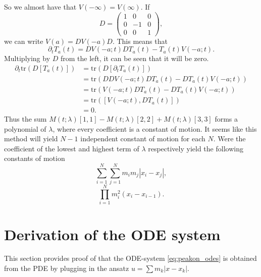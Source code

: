 \documentclass[english,master]{liumaiex}
\theoremstyle{plain}
\theoremstyle{definition}
\newcommand{\tr}{\text{tr}}
\begin{document}
So we almost have that $V(-\infty) = V(\infty)$. If
\begin{equation}
	D = 
\begin{pmatrix}
	1 & 0 & 0 \\
	0 & -1 & 0 \\
	0 & 0 & 1
\end{pmatrix},
\end{equation}
%
we can write $V(a) = DV(-a)D$. This means that 
\begin{equation}
	\partial_t T_a(t) = DV(-a;t)DT_a(t) - T_a(t)V(-a;t).
\end{equation}
Multiplying by $D$ from the left, it can be seen that it will be zero.
\begin{equation}
\begin{aligned}
	\partial_t \tr(D [T_a(t)])
	&= \tr(D [\partial_t T_a(t)]) \\
	&= \tr(DDV(-a;t)DT_a(t) - DT_a(t)V(-a;t)) \\
	&= \tr(V(-a;t)DT_a(t) - DT_a(t)V(-a;t)) \\
	&= \tr([V(-a;t), DT_a(t)]) \\
	&= 0.
\end{aligned}
\end{equation}
Thus the sum $M(t;\lambda)[1,1] - M(t;\lambda)[2,2] + M(t;\lambda)[3,3]$ forms a polynomial of $\lambda$, where every coefficient is a constant of motion. It seems like this method will yield $N-1$ independent constant of motion for each $N$. Were the coefficient of the lowest and highest term of $\lambda$ respectively yield the following constants of motion
\begin{equation}
	\sum_{i=1}^{N}\sum_{j=1}^N m_i m_j |x_i - x_j|,
\end{equation}
\begin{equation}
	\prod_{i=1}^{N} m_i^2 (x_i - x_{i-1}).
\end{equation}

%
%
\newpage
\appendix

\section{Derivation of the ODE system} \label{sec:DerivationODE}

This section provides proof of that the ODE-system \eqref{eq:peakon_odes} is obtained from the PDE by plugging in the ansatz $u = \sum m_k |x - x_k|$.
\end{document}
